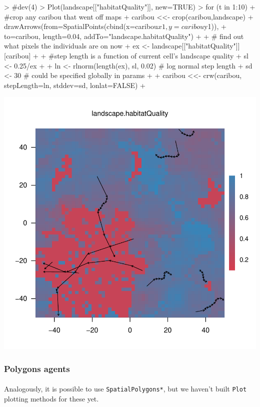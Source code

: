 \documentclass{article}
\begin{document}
\begin{Schunk}
\begin{Sinput}
> #dev(4)
> Plot(landscape[["habitatQuality"]], new=TRUE)
> for (t in 1:10) {
+   #crop any caribou that went off maps
+   caribou <<- crop(caribou,landscape)
+   drawArrows(from=SpatialPoints(cbind(x=caribou$x1, y=caribou$y1)),
+              to=caribou, length=0.04, addTo="landscape.habitatQuality")
+ 
+   # find out what pixels the individuals are on now
+   ex <- landscape[["habitatQuality"]][caribou]
+ 
+   #step length is a function of current cell's landscape quality
+   sl <- 0.25/ex
+ 
+   ln <- rlnorm(length(ex), sl, 0.02) # log normal step length
+   sd <- 30 # could be specified globally in params
+ 
+   caribou <<- crw(caribou, stepLength=ln, stddev=sd, lonlat=FALSE)
+ }
\end{Sinput}
\end{Schunk}
\includegraphics{introduction-agent-crw-trajectory}

\subsubsection{Polygons agents}

\paragraph{}
Analogously, it is possible to use \texttt{SpatialPolygons*}, but we haven't built \texttt{Plot} plotting methods for these yet.
\end{document}
